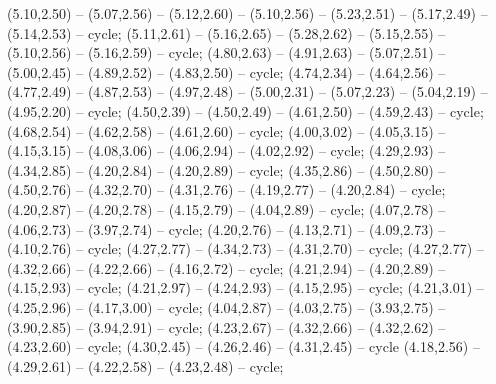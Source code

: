 { (5.10,2.50) -- (5.07,2.56) -- (5.12,2.60) -- (5.10,2.56) -- (5.23,2.51) -- (5.17,2.49) -- (5.14,2.53) -- cycle;
 (5.11,2.61) -- (5.16,2.65) -- (5.28,2.62) -- (5.15,2.55) -- (5.10,2.56) -- (5.16,2.59) -- cycle;
 (4.80,2.63) -- (4.91,2.63) -- (5.07,2.51) -- (5.00,2.45) -- (4.89,2.52) -- (4.83,2.50) -- cycle;
 (4.74,2.34) -- (4.64,2.56) -- (4.77,2.49) -- (4.87,2.53) -- (4.97,2.48) -- (5.00,2.31) -- (5.07,2.23) -- (5.04,2.19) -- (4.95,2.20) -- cycle;
 (4.50,2.39) -- (4.50,2.49) -- (4.61,2.50) -- (4.59,2.43) -- cycle;
 (4.68,2.54) -- (4.62,2.58) -- (4.61,2.60) -- cycle;
 (4.00,3.02) -- (4.05,3.15) -- (4.15,3.15) -- (4.08,3.06) -- (4.06,2.94) -- (4.02,2.92) -- cycle;
 (4.29,2.93) -- (4.34,2.85) -- (4.20,2.84) -- (4.20,2.89) -- cycle;
 (4.35,2.86) -- (4.50,2.80) -- (4.50,2.76) -- (4.32,2.70) -- (4.31,2.76) -- (4.19,2.77) -- (4.20,2.84) -- cycle;
 (4.20,2.87) -- (4.20,2.78) -- (4.15,2.79) -- (4.04,2.89) -- cycle;
 (4.07,2.78) -- (4.06,2.73) -- (3.97,2.74) -- cycle;
 (4.20,2.76) -- (4.13,2.71) -- (4.09,2.73) -- (4.10,2.76) -- cycle;
 (4.27,2.77) -- (4.34,2.73) -- (4.31,2.70) -- cycle;
 (4.27,2.77) -- (4.32,2.66) -- (4.22,2.66) -- (4.16,2.72) -- cycle;
 (4.21,2.94) -- (4.20,2.89) -- (4.15,2.93) -- cycle;
 (4.21,2.97) -- (4.24,2.93) -- (4.15,2.95) -- cycle;
 (4.21,3.01) -- (4.25,2.96) -- (4.17,3.00) -- cycle;
 (4.04,2.87) -- (4.03,2.75) -- (3.93,2.75) -- (3.90,2.85) -- (3.94,2.91) -- cycle;
 (4.23,2.67) -- (4.32,2.66) -- (4.32,2.62) -- (4.23,2.60) -- cycle;
 (4.30,2.45) -- (4.26,2.46) -- (4.31,2.45) -- cycle (4.18,2.56) -- (4.29,2.61) -- (4.22,2.58) -- (4.23,2.48) -- cycle;
}
